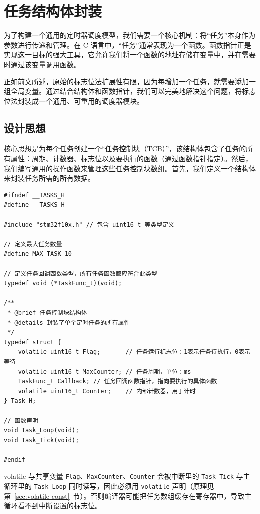 \section{任务结构体封装}

为了构建一个通用的定时器调度模型，我们需要一个核心机制：将“任务”本身作为参数进行传递和管理。在 C 语言中，“任务”通常表现为一个函数。函数指针正是实现这一目标的强大工具，它允许我们将一个函数的地址存储在变量中，并在需要时通过该变量调用函数。

正如前文所述，原始的标志位法扩展性有限，因为每增加一个任务，就需要添加一组全局变量。通过结合结构体和函数指针，我们可以完美地解决这个问题，将标志位法封装成一个通用、可重用的调度器模块。

\subsection{设计思想}

核心思想是为每个任务创建一个“任务控制块（TCB）”，该结构体包含了任务的所有属性：周期、计数器、标志位以及要执行的函数（通过函数指针指定）。然后，我们编写通用的操作函数来管理这些任务控制块数组。首先，我们定义一个结构体来封装任务所需的所有数据。

\begin{lstlisting}[style=c]
#ifndef __TASKS_H
#define __TASKS_H

#include "stm32f10x.h" // 包含 uint16_t 等类型定义

// 定义最大任务数量
#define MAX_TASK 10

// 定义任务回调函数类型，所有任务函数都应符合此类型
typedef void (*TaskFunc_t)(void);

/**
 * @brief 任务控制块结构体
 * @details 封装了单个定时任务的所有属性
 */
typedef struct {
    volatile uint16_t Flag;       // 任务运行标志位：1表示任务待执行，0表示等待
    volatile uint16_t MaxCounter; // 任务周期，单位：ms
    TaskFunc_t Callback; // 任务回调函数指针，指向要执行的具体函数
    volatile uint16_t Counter;    // 内部计数器，用于计时
} Task_H;

// 函数声明
void Task_Loop(void);
void Task_Tick(void);

#endif
\end{lstlisting}

\begin{anybox}{volatile 与共享变量}
\texttt{Flag}、\texttt{MaxCounter}、\texttt{Counter} 会被中断里的 \texttt{Task\_Tick} 与主循环里的 \texttt{Task\_Loop} 同时读写，因此必须用 \texttt{volatile} 声明（原理见第~\ref{sec:volatile-const}~节）。否则编译器可能把任务数组缓存在寄存器中，导致主循环看不到中断设置的标志位。
\end{anybox}

